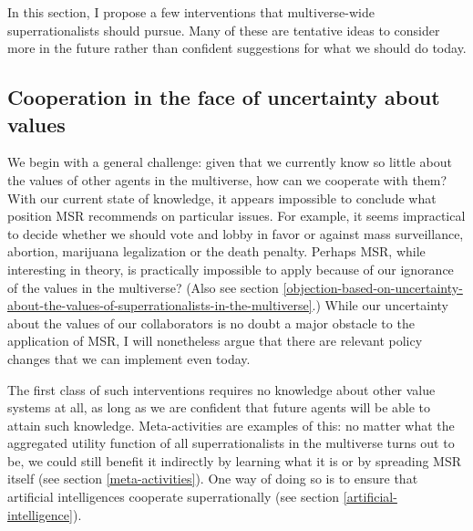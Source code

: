 In this section, I propose a few interventions that multiverse-wide
superrationalists should pursue. Many of these are tentative ideas to
consider more in the future rather than confident suggestions for what
we should do today.

\hypertarget{cooperation-in-the-face-of-uncertainty-about-values}{\subsection{Cooperation
in the face of uncertainty about
values}\label{cooperation-in-the-face-of-uncertainty-about-values}}

We begin with a general challenge: given that we currently know so
little about the values of other agents in the multiverse, how can we
cooperate with them? With our current state of knowledge, it appears
impossible to conclude what position MSR recommends on particular
issues. For example, it seems impractical to decide whether we should
vote and lobby in favor or against mass surveillance, abortion,
marijuana legalization or the death penalty. Perhaps MSR, while
interesting in theory, is practically impossible to apply because of our
ignorance of the values in the multiverse? (Also see section
\ref{objection-based-on-uncertainty-about-the-values-of-superrationalists-in-the-multiverse}.) While our uncertainty about the values of our
collaborators is no doubt a major obstacle to the application of MSR, I
will nonetheless argue that there are relevant policy changes that we
can implement even today.

The first class of such interventions requires no knowledge about other
value systems at all, as long as we are confident that future agents
will be able to attain such knowledge. Meta-activities are examples of
this: no matter what the aggregated utility function of all
superrationalists in the multiverse turns out to be, we could still
benefit it indirectly by learning what it is or by spreading MSR itself
(see section
\ref{meta-activities}). One
way of doing so is to ensure that artificial intelligences cooperate
superrationally (see section
\ref{artificial-intelligence}).

